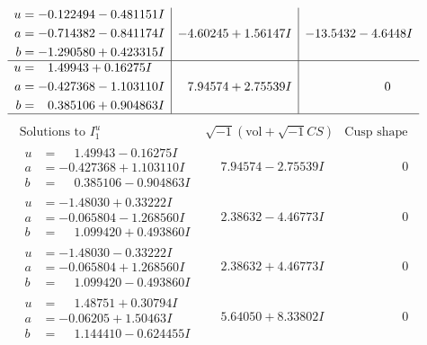 \documentclass[1p]{elsarticle_modified}
\theoremstyle{definition}
\newcommand{\I}{\sqrt{-1}}
\begin{document}
$$\begin{array}{c|c|c}
\begin{aligned}
u &= -0.122494 - 0.481151 I \\
a &= -0.714382 - 0.841174 I \\
b &= -1.290580 + 0.423315 I\end{aligned}
 & -4.60245 + 1.56147 I & -13.5432 - 4.6448 I \\ \hline\begin{aligned}
u &= \phantom{-}1.49943 + 0.16275 I \\
a &= -0.427368 - 1.103110 I \\
b &= \phantom{-}0.385106 + 0.904863 I\end{aligned}
 & \phantom{-}7.94574 + 2.75539 I & \phantom{-0.000000 } 0\\
 \hline 
 \end{array}$$\newpage$$\begin{array}{c|c|c}  
\text{Solutions to }I^u_{1}& \I (\text{vol} + \sqrt{-1}CS) & \text{Cusp shape}\\
 \hline 
\begin{aligned}
u &= \phantom{-}1.49943 - 0.16275 I \\
a &= -0.427368 + 1.103110 I \\
b &= \phantom{-}0.385106 - 0.904863 I\end{aligned}
 & \phantom{-}7.94574 - 2.75539 I & \phantom{-0.000000 } 0 \\ \hline\begin{aligned}
u &= -1.48030 + 0.33222 I \\
a &= -0.065804 - 1.268560 I \\
b &= \phantom{-}1.099420 + 0.493860 I\end{aligned}
 & \phantom{-}2.38632 - 4.46773 I & \phantom{-0.000000 } 0 \\ \hline\begin{aligned}
u &= -1.48030 - 0.33222 I \\
a &= -0.065804 + 1.268560 I \\
b &= \phantom{-}1.099420 - 0.493860 I\end{aligned}
 & \phantom{-}2.38632 + 4.46773 I & \phantom{-0.000000 } 0 \\ \hline\begin{aligned}
u &= \phantom{-}1.48751 + 0.30794 I \\
a &= -0.06205 + 1.50463 I \\
b &= \phantom{-}1.144410 - 0.624455 I\end{aligned}
 & \phantom{-}5.64050 + 8.33802 I & \phantom{-0.000000 } 0 \\ \hline\begin{aligned}

\end{aligned}
\end{array}$$
\end{document}
